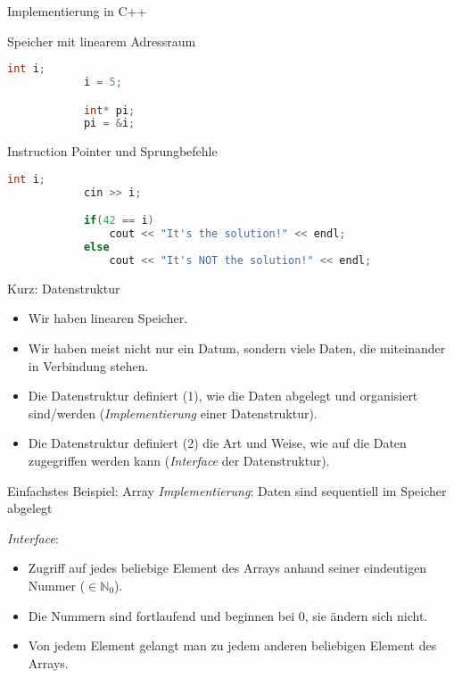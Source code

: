 \begin{frame}[fragile]{Implementierung in C++}
	\footnotesize
	
	\begin{block}{Speicher mit linearem Adressraum}
		\begin{lstlisting}[language=C++]
			int i;
			i = 5;

			int* pi;
			pi = &i;
		\end{lstlisting}
	\end{block}
	
	\pause
	
	\begin{block}{Instruction Pointer und Sprungbefehle}
		\begin{lstlisting}[language=C++]
			int i;
			cin >> i;

			if(42 == i)
			    cout << "It's the solution!" << endl;
			else
			    cout << "It's NOT the solution!" << endl;
		\end{lstlisting}
	\end{block}
\end{frame}

\begin{frame}{Kurz: Datenstruktur}
	\begin{itemize}
		\item Wir haben linearen Speicher.
		\item Wir haben meist nicht nur ein Datum, sondern viele Daten, die miteinander in Verbindung stehen.
		\item Die Datenstruktur definiert (1), wie die Daten abgelegt und organisiert sind/werden (\emph{Implementierung} einer Datenstruktur).
		\item Die Datenstruktur definiert (2) die Art und Weise, wie auf die Daten zugegriffen werden kann (\emph{Interface} der Datenstruktur).
	\end{itemize}
	
	\pause
	
	\footnotesize
	
	\begin{block}{Einfachstes Beispiel: Array}
		\emph{Implementierung}: Daten sind sequentiell im Speicher abgelegt
		
		\emph{Interface}:
		\begin{itemize}
			\item Zugriff auf jedes beliebige Element des Arrays anhand seiner eindeutigen Nummer ($\in \mathbb{N}_0$).
			\item Die Nummern sind fortlaufend und beginnen bei 0, sie ändern sich nicht.
			\item Von jedem Element gelangt man zu jedem anderen beliebigen Element des Arrays.
		\end{itemize}
	\end{block}
\end{frame}

